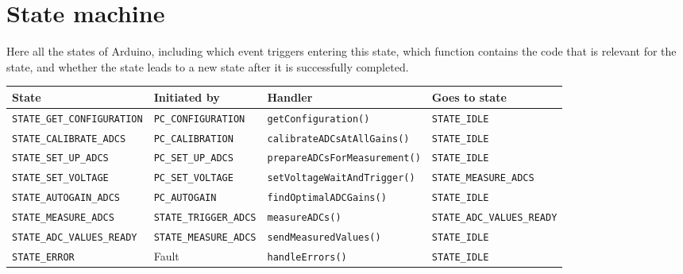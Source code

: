 \documentclass[11pt,a4paper,english]{article}
\begin{document}
\clearpage

\section{State machine}\label{sec:state_machine}
Here all the states of Arduino, including which event triggers entering this state, which function contains the code that is relevant for the state, and whether the state leads to a new state after it is successfully completed.
\begin{center}
\small
\begin{tabular}{llll}\toprule
State					        & Initiated by                 & Handler                            & Goes to state        \\\midrule
\texttt{STATE\_GET\_CONFIGURATION} & \texttt{PC\_CONFIGURATION}    & \texttt{getConfiguration()}    & \texttt{STATE\_IDLE}\\
\texttt{STATE\_CALIBRATE\_ADCS} & \texttt{PC\_CALIBRATION}     & \texttt{calibrateADCsAtAllGains()} & \texttt{STATE\_IDLE}\\
\texttt{STATE\_SET\_UP\_ADCS}   & \texttt{PC\_SET\_UP\_ADCS}   & \texttt{prepareADCsForMeasurement()} & \texttt{STATE\_IDLE} \\
\texttt{STATE\_SET\_VOLTAGE}    & \texttt{PC\_SET\_VOLTAGE}    & \texttt{setVoltageWaitAndTrigger()}       & \texttt{STATE\_MEASURE\_ADCS}\\
\texttt{STATE\_AUTOGAIN\_ADCS}  & \texttt{PC\_AUTOGAIN}        & \texttt{findOptimalADCGains()}     & \texttt{STATE\_IDLE} \\
\texttt{STATE\_MEASURE\_ADCS}   & \texttt{STATE\_TRIGGER\_ADCS} & \texttt{measureADCs()}   & \texttt{STATE\_ADC\_VALUES\_READY}\\
\texttt{STATE\_ADC\_VALUES\_READY} & \texttt{STATE\_MEASURE\_ADCS} & \texttt{sendMeasuredValues()}  & \texttt{STATE\_IDLE}\\
\texttt{STATE\_ERROR}           & Fault                        & \texttt{handleErrors()}            & \texttt{STATE\_IDLE}\\
\bottomrule
\end{tabular}
\end{center}
\end{document}
